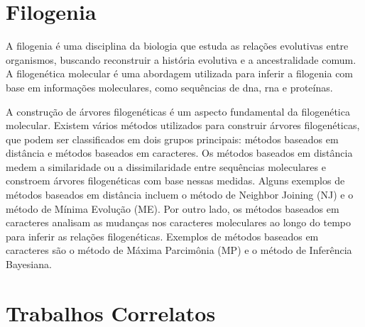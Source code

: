 \section{Filogenia}

A filogenia é uma disciplina da biologia que estuda as relações evolutivas entre organismos, buscando reconstruir a história evolutiva e a ancestralidade comum. A filogenética molecular é uma abordagem utilizada para inferir a filogenia com base em informações moleculares, como sequências de \gls{dna}, \gls{rna} e proteínas\cite{felsenstein_inferring_2004}.

A construção de árvores filogenéticas é um aspecto fundamental da filogenética molecular. Existem vários métodos utilizados para construir árvores filogenéticas, que podem ser classificados em dois grupos principais: métodos baseados em distância e métodos baseados em caracteres.
Os métodos baseados em distância medem a similaridade ou a dissimilaridade entre sequências moleculares e constroem árvores filogenéticas com base nessas medidas. Alguns exemplos de métodos baseados em distância incluem o método de Neighbor Joining (NJ) e o método de Mínima Evolução (ME).
Por outro lado, os métodos baseados em caracteres analisam as mudanças nos caracteres moleculares ao longo do tempo para inferir as relações filogenéticas. Exemplos de métodos baseados em caracteres são o método de Máxima Parcimônia (MP) e o método de Inferência Bayesiana\cite{swofford_phylogenetic_1996}.





\section{Trabalhos Correlatos}


